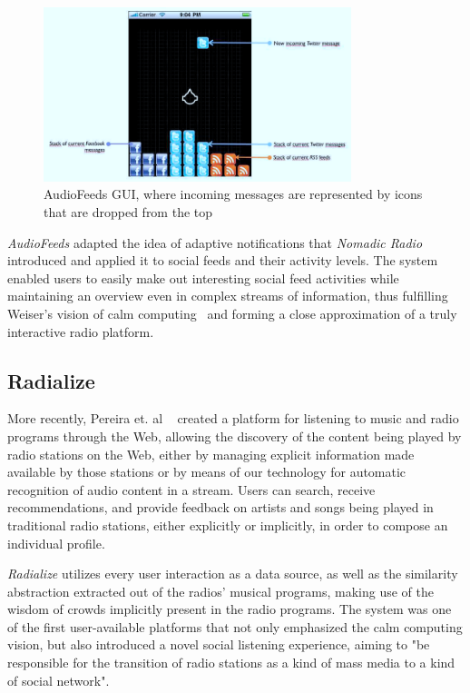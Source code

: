 \begin{figure}[h]
\centering
\includegraphics[width=0.8\textwidth]{./Images/audiofeeds.png}
\caption{AudioFeeds GUI, where incoming messages are represented by icons that are dropped from the top}
\label{fig:test_env}
\end{figure}

\textit{AudioFeeds} adapted the idea of adaptive notifications that \textit{Nomadic Radio} introduced and applied it to social feeds and their activity levels. The system enabled users to easily make out interesting social feed activities while maintaining an overview even in complex streams of information, thus fulfilling Weiser’s vision of calm computing~\cite{Weiser1997} and forming a close approximation of a truly interactive radio platform.


\subsection{Radialize}

More recently, Pereira et. al ~\cite{Pereira2013} created a platform for listening to music and radio programs through the Web, allowing the discovery of the content being played by radio stations on the Web, either by managing explicit information made available by those stations or by means of our technology for automatic recognition of audio content in a stream. Users can search, receive recommendations, and provide feedback on artists and songs being played in traditional radio stations, either explicitly or implicitly, in order to compose an individual profile.

\textit{Radialize} utilizes every user interaction as a data source, as well as the similarity abstraction extracted out of the radios’ musical programs, making use of the wisdom of crowds implicitly present in the radio programs. The system was one of the first user-available platforms that not only emphasized the calm computing vision, but also introduced a novel social listening experience, aiming to "be responsible for the transition of radio stations as a kind of mass media to a kind of social network".~\cite{Pereira2013}


